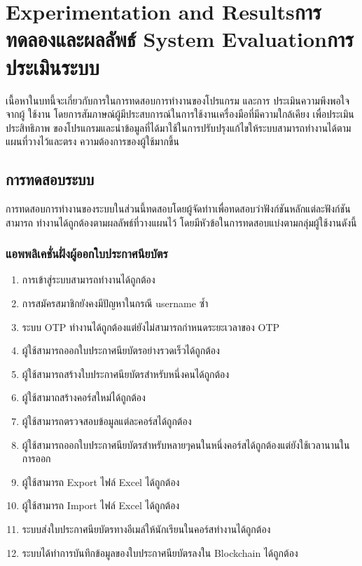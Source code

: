\chapter{\ifproject%
\ifenglish Experimentation and Results\else การทดลองและผลลัพธ์\fi
\else%
\ifenglish System Evaluation\else การประเมินระบบ\fi
\fi}

\enskip \enskip \enskip \enskip \enskip เนื้อหาในบทนี้จะเกี่ยวกับการในการทดสอบการทำงานของโปรแกรม และการ ประเมินความพึงพอใจจากผู้ ใช้งาน โดยการสัมภาษณ์ผู้มีประสบการณ์ในการใช้งานเครื่องมือที่มีความใกล้เคียง เพื่อประเมินประสิทธิภาพ ของโปรแกรมและนำข้อมูลที่ได้มาใช้ในการปรับปรุงแก้ไขให้ระบบสามารถทำงานได้ตาม แผนที่วางไว้และตรง ความต้องการของผู้ใช้มากขึ้น
\section{การทดสอบระบบ}
การทดสอบการทำงานของระบบในส่วนนี้ทดสอบโดยผู้จัดทำาเพื่อทดสอบว่าฟังก์ชันหลักแต่ละฟังก์ชันสามารถ ทำงานได้ถูกต้องตามผลลัพธ์ที่วางแผนไว้ โดยมีหัวข้อในการทดสอบแบ่งตามกลุ่มผู้ใช้งานดังนี้
\subsection{แอพพลิเคชั่นฝั่งผู้ออกใบประกาศนียบัตร}
\begin{enumerate}
\item การเข้าสู่ระบบสามารถทำงานได้ถูกต้อง
\item การสมัครสมาชิกยังคงมีปัญหาในกรณี username ซ้ำ
\item ระบบ OTP ทำงานได้ถูกต้องแต่ยังไม่สามารถกำหนดระยะเวลาของ OTP
\item ผู้ใช้สามารถออกใบประกาศนียบัตรอย่างรวดเร็วได้ถูกต้อง
\item ผู้ใช้สามารถสร้างใบประกาศนียบัตรสำหรับหนึ่งคนได้ถูกต้อง
\item ผู้ใช้สามาถสร้างคอร์สใหม่ได้ถูกต้อง
\item ผู้ใช้สามารถตรวจสอบข้อมูลแต่ละคอร์สได้ถูกต้อง
\item ผู้ใช้สามารถออกใบประกาศนียบัตรสำหรับหลายๆคนในหนึ่งคอร์สได้ถูกต้องแต่ยังใช้เวลานานในการออก
\item ผู้ใช้สามารถ Export ไฟล์ Excel ได้ถูกต้อง
\item ผู้ใช้สามารถ Import ไฟล์ Excel ได้ถูกต้อง
\item ระบบส่งใบประกาศนียบัตรทางอีเมล์ให้นักเรียนในคอร์สทำงานได้ถูกต้อง
\item ระบบได้ทำการบันทึกข้อมูลของใบประกาศนียบัตรลงใน Blockchain ได้ถูกต้อง
\end{enumerate}

